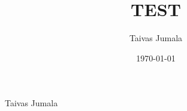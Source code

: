 \title{TEST}
\author{Taivas Jumala}
\date{\today}

\begin{titlingpage}
    \thispagestyle{empty}
    \begin{center}
        \par
        \setlength{\parskip}{1ex}

        \color{blue}{\rule{\textwidth}{0.4pt}}\par

        \HUGE{\bfseries \textcolor{foreground_0}{TEST}}\par

        {\color{blue}{\rule{\textwidth}{0.4pt}}\par}

        \vspace{100pt}

        \Large{\textcolor{foreground_0}{Taivas Jumala}}

    \end{center}
\end{titlingpage}